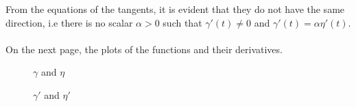\documentclass[a4paper,10pt]{article}
\begin{document}
\noindent
From the equations of the tangents, it is evident that they do not have the same direction, i.e there is no scalar $\alpha > 0$ such that $\gamma'(t) \neq 0$ and $\gamma'(t) = \alpha\eta'(t)$. \\\\

\noindent
On the next page, the plots of the functions and their derivatives.
\pagebreak

    \begin{figure}[!htb]\centering

            \caption{$\gamma$ and $\eta$}
    \end{figure}
 \begin{figure}[!htb]\centering
        \caption{$\gamma'$ and $\eta'$}

    \end{figure}
\end{document}
